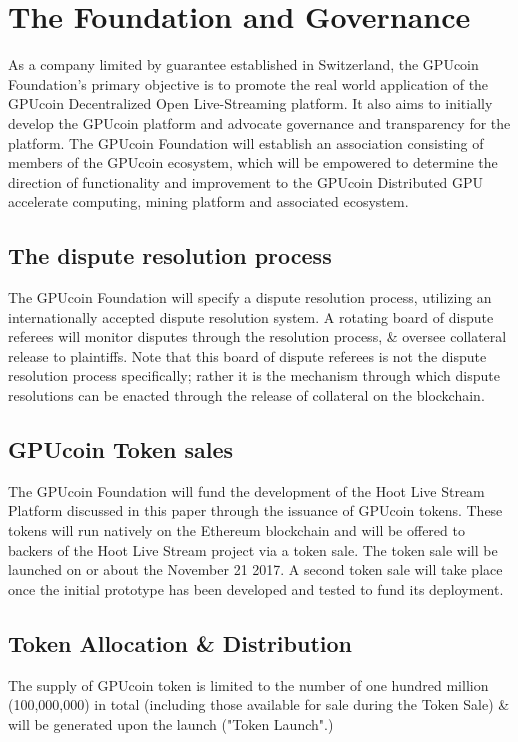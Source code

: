 \documentclass{article}
\begin{document}
\section{The Foundation and Governance} %
\label{sec:the_foundation_and_governance}
As a company limited by guarantee established in Switzerland, the GPUcoin Foundation's primary objective is to promote the real world application of the GPUcoin Decentralized Open Live-Streaming platform. It also aims to initially develop the GPUcoin platform and advocate governance and transparency for the platform. The GPUcoin Foundation will establish an association consisting of members of the GPUcoin ecosystem, which will be empowered to determine the direction of functionality and improvement to the GPUcoin Distributed GPU accelerate computing, mining platform and associated ecosystem.

\subsection{The dispute resolution process} %
\label{sub:the_dispute_resolution_process}
The GPUcoin Foundation will specify a dispute resolution process, utilizing an internationally accepted dispute resolution system. A rotating board of dispute referees will monitor disputes through the resolution process, \& oversee collateral release to plaintiffs. Note that this board of dispute referees is not the dispute resolution process specifically; rather it is the mechanism through which dispute resolutions can be enacted through the release of collateral on the blockchain.


\subsection{GPUcoin Token sales} %
\label{sub:hoot_token_sales}
The GPUcoin Foundation will fund the development of the Hoot Live Stream Platform discussed in this paper through the issuance of GPUcoin tokens. These tokens will run natively on the Ethereum blockchain and will be offered to backers of the Hoot Live Stream project via a token sale. The token sale will be launched on or about the November 21 2017. A second token sale will take place once the initial prototype has been developed and tested to fund its deployment. 

\subsection{Token Allocation \& Distribution} %
\label{sub:token_allocation_and_distribution}
 The supply of GPUcoin token is limited to the number of one hundred million (100,000,000) in total (including those available for sale during the Token Sale) \& will be generated upon the launch ("Token Launch".)
\end{document}
